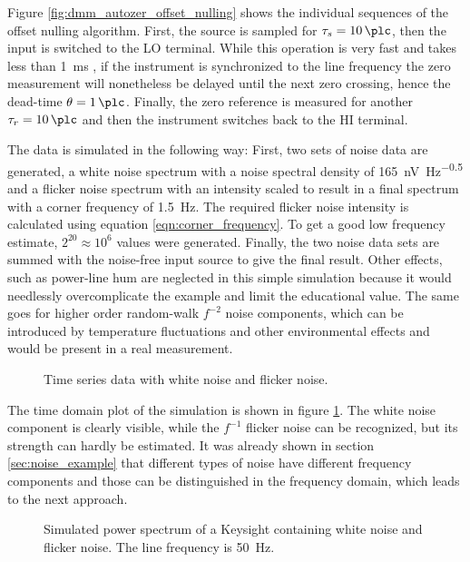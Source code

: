 Figure \ref{fig:dmm_autozer_offset_nulling} shows the individual sequences of the offset nulling algorithm. First, the source is sampled for $\tau_s = \qty{10}{\plc}$, then the input is switched to the LO terminal. While this operation is very fast and takes less than \qty{1}{\ms} \cite{article_3458A_input_impedance}, if the instrument is synchronized to the line frequency the zero measurement will nonetheless be delayed until the next zero crossing, hence the dead-time $\theta = \qty{1}{\plc}$. Finally, the zero reference is measured for another $\tau_r = \qty{10}{\plc}$ and then the instrument switches back to the HI terminal.

The data is simulated in the following way: First, two sets of noise data are generated, a white noise spectrum with a noise spectral density of \qty[power-half-as-sqrt, per-mode=symbol]{165}{\nV \Hz\tothe{-0.5}} and a flicker noise spectrum with an intensity scaled to result in a final spectrum with a corner frequency of \qty{1.5}{\Hz}. The required flicker noise intensity is calculated using equation \ref{eqn:corner_frequency}. To get a good low frequency estimate, $2^{20} \approx 10^{6}$ values were generated. Finally, the two noise data sets are summed with the noise-free input source to give the final result. Other effects, such as power-line hum are neglected in this simple simulation because it would needlessly overcomplicate the example and limit the educational value. The same goes for higher order random-walk $f^{-2}$ noise components, which can be introduced by temperature fluctuations and other environmental effects and would be present in a real measurement.
\begin{figure}[ht]
    \centering
    \caption{Time series data with white noise and flicker noise.}
    \label{fig:autozero_raw_time}
\end{figure}

The time domain plot of the simulation is shown in figure \ref{fig:autozero_raw_time}. The white noise component is clearly visible, while the $f^{-1}$ flicker noise can be recognized, but its strength can hardly be estimated. It was already shown in section \ref{sec:noise_example} that different types of noise have different frequency components and those can be distinguished in the frequency domain, which leads to the next approach.
\begin{figure}[hb]
    \centering
    \caption{Simulated power spectrum of a Keysight  containing white noise and flicker noise. The line frequency is \qty{50}{\Hz}.}
    \label{fig:autozero_raw_psd}
\end{figure}

